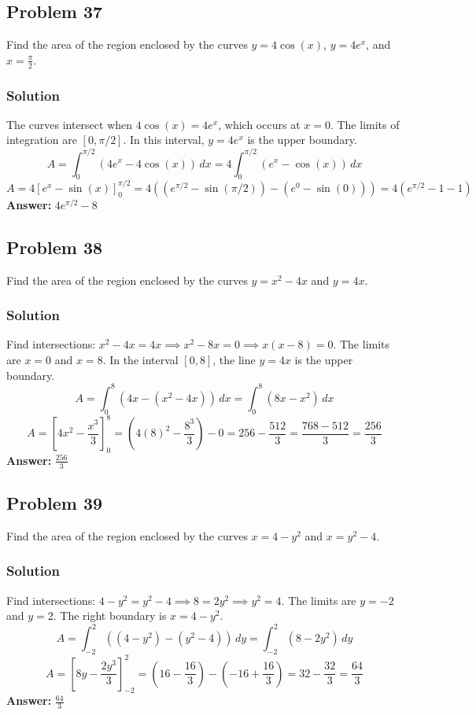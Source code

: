 \documentclass{article}
\begin{document}
\subsection{Problem 37}
Find the area of the region enclosed by the curves $y = 4\cos(x)$, $y = 4e^x$, and $x = \frac{\pi}{2}$.
\subsubsection*{Solution}
The curves intersect when $4\cos(x) = 4e^x$, which occurs at $x=0$. The limits of integration are $[0, \pi/2]$.
In this interval, $y=4e^x$ is the upper boundary.
$$ A = \int_{0}^{\pi/2} (4e^x - 4\cos(x)) \,dx = 4 \int_{0}^{\pi/2} (e^x - \cos(x)) \,dx $$
$$ A = 4 \left[ e^x - \sin(x) \right]_{0}^{\pi/2} = 4 \left( (e^{\pi/2} - \sin(\pi/2)) - (e^0 - \sin(0)) \right) = 4(e^{\pi/2} - 1 - 1) $$
\textbf{Answer:} $ 4e^{\pi/2} - 8 $

\subsection{Problem 38}
Find the area of the region enclosed by the curves $y = x^2 - 4x$ and $y = 4x$.
\subsubsection*{Solution}
Find intersections: $x^2 - 4x = 4x \implies x^2 - 8x = 0 \implies x(x-8)=0$. The limits are $x=0$ and $x=8$.
In the interval $[0, 8]$, the line $y=4x$ is the upper boundary.
$$ A = \int_{0}^{8} (4x - (x^2 - 4x)) \,dx = \int_{0}^{8} (8x - x^2) \,dx $$
$$ A = \left[ 4x^2 - \frac{x^3}{3} \right]_{0}^{8} = \left(4(8)^2 - \frac{8^3}{3}\right) - 0 = 256 - \frac{512}{3} = \frac{768 - 512}{3} = \frac{256}{3} $$
\textbf{Answer:} $ \frac{256}{3} $

\subsection{Problem 39}
Find the area of the region enclosed by the curves $x = 4 - y^2$ and $x = y^2 - 4$.
\subsubsection*{Solution}
Find intersections: $4 - y^2 = y^2 - 4 \implies 8 = 2y^2 \implies y^2 = 4$. The limits are $y=-2$ and $y=2$.
The right boundary is $x = 4 - y^2$.
$$ A = \int_{-2}^{2} ((4 - y^2) - (y^2 - 4)) \,dy = \int_{-2}^{2} (8 - 2y^2) \,dy $$
$$ A = \left[ 8y - \frac{2y^3}{3} \right]_{-2}^{2} = \left(16 - \frac{16}{3}\right) - \left(-16 + \frac{16}{3}\right) = 32 - \frac{32}{3} = \frac{64}{3} $$
\textbf{Answer:} $ \frac{64}{3} $
\end{document}
